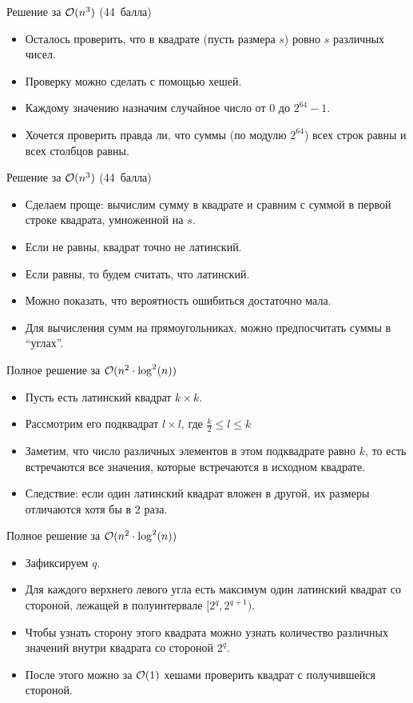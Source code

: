 \begin{frame}{Решение за $\mathcal{O}(n ^ 3)$ (44~балла)}
  \begin{itemize}
  \item Осталось проверить, что в квадрате (пусть размера $s$) ровно $s$ различных чисел.
  \item Проверку можно сделать с помощью хешей.
  \item Каждому значению назначим случайное число от $0$ до $2^{64} - 1$.
  \item Хочется проверить правда ли, что суммы (по модулю $2^{64}$) всех строк равны и всех столбцов равны.
  \end{itemize}
\end{frame}

\begin{frame}{Решение за $\mathcal{O}(n ^ 3)$ (44~балла)}
  \begin{itemize}
  \item Сделаем проще: вычислим сумму в квадрате и сравним с суммой в первой строке квадрата, умноженной на $s$.
  \item Если не равны, квадрат точно не латинский.
  \item Если равны, то будем считать, что латинский.
  \item Можно показать, что вероятность ошибиться достаточно мала.
  \item Для вычисления сумм на прямоугольниках, можно предпосчитать суммы в ``углах''.
  \end{itemize}
\end{frame}


\begin{frame}{Полное решение за $\mathcal{O}(n ^ 2 \cdot \log^2(n))$}
  \begin{itemize}
  \item Пусть есть латинский квадрат $k \times k$.
  \item Рассмотрим его подквадрат $l \times l$, где $\frac{k}{2} \le l \le k$
  \item Заметим, что число различных элементов в этом подквадрате равно $k$, то есть встречаются все значения, которые встречаются в исходном квадрате.
  \item Следствие: если один латинский квадрат вложен в другой, их размеры отличаются хотя бы в $2$ раза.
  \end{itemize}
\end{frame}

\begin{frame}{Полное решение за $\mathcal{O}(n ^ 2 \cdot \log^2(n))$}
  \begin{itemize}
  \item Зафиксируем $q$.
  \item Для каждого верхнего левого угла есть максимум один латинский квадрат со стороной, лежащей в полуинтервале $[2^q, 2^{q + 1})$.
  \item Чтобы узнать сторону этого квадрата можно узнать количество различных значений внутри квадрата со стороной $2^q$.
  \item После этого можно за $\mathcal{O}(1)$ хешами проверить квадрат с получившейся стороной.
  \end{itemize}
\end{frame}

